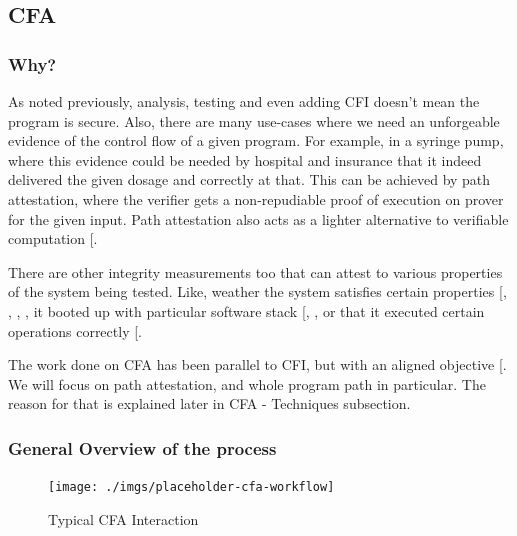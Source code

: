 \documentclass[a4paper, nobind]{templates/ociamthesis}
\begin{document}
\subsection{CFA}\label{cfa}

\subsubsection{Why?}\label{why}

As noted previously, analysis, testing and even adding CFI doesn't mean the program is secure.
Also, there are many use-cases where we need an unforgeable evidence of the control flow
of a given program. For example, in a syringe pump, where this evidence could be
needed by hospital and insurance that it indeed delivered the given dosage and correctly at that.
This can be achieved by path attestation, where the verifier gets a non-repudiable
proof of execution on prover for the given input.
Path attestation also acts as a lighter alternative to verifiable computation {[}\citeproc{ref-walfish2015verifying}{55}{]}.

There are other integrity measurements too that can attest to various properties
of the system being tested.
Like, weather the system satisfies certain properties {[}, , , \citeproc{ref-sadeghi2004property}{47}{]},
it booted up with particular software stack {[}, \citeproc{ref-gasser1989digital}{27}{]},
or that it executed certain operations correctly {[}\citeproc{ref-sun2020oat}{53}{]}.

The work done on CFA has been parallel to CFI, but with an aligned objective {[}\citeproc{ref-sok}{5}{]}.
We will focus on path attestation, and whole program path in particular.
The reason for that is explained later in CFA - Techniques subsection.

\subsubsection{General Overview of the process}\label{general-overview-of-the-process}

\begin{figure}[H]

{\centering \texttt{[image: ./imgs/placeholder-cfa-workflow]} 

}

\caption{Typical CFA Interaction}\label{fig:cfa-workflow}
\end{figure}
\end{document}
